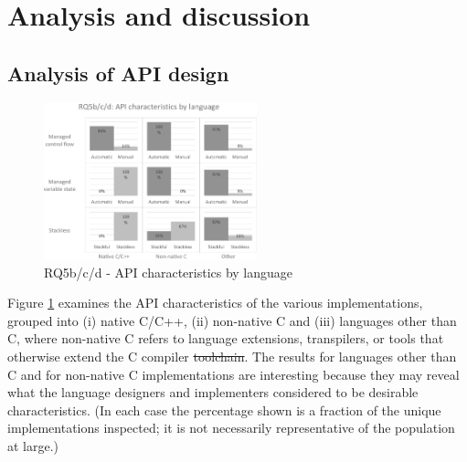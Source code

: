 \documentclass[format=acmsmall, review=false, screen=false]{acmart}
\providecommand{\DIFadd}[1]{{\protect\color{blue}\uwave{#1}}} %
\providecommand{\DIFdel}[1]{{\protect\color{red}\sout{#1}}}                      %
\providecommand{\DIFaddbegin}{} %
\providecommand{\DIFaddend}{} %
\providecommand{\DIFdelbegin}{} %
\providecommand{\DIFdelend}{} %
\newcommand{\DIFscaledelfig}{0.5}
\newlength{\DIFdelgraphicswidth} %
\newlength{\DIFdelgraphicsheight} %
\newcommand{\DIFaddincludegraphics}[2][]{{\color{blue}\fbox{\DIFOincludegraphics[#1]{#2}}}} %
\newcommand{\DIFdelincludegraphics}[2][]{%
\sbox{\DIFdelgraphicsbox}{\DIFOincludegraphics[#1]{#2}}%
\settoboxwidth{\DIFdelgraphicswidth}{\DIFdelgraphicsbox} %
\settoboxtotalheight{\DIFdelgraphicsheight}{\DIFdelgraphicsbox} %
\scalebox{\DIFscaledelfig}{%
\parbox[b]{\DIFdelgraphicswidth}{\usebox{\DIFdelgraphicsbox}\\[-\baselineskip] \rule{\DIFdelgraphicswidth}{0em}}\llap{\resizebox{\DIFdelgraphicswidth}{\DIFdelgraphicsheight}{%
\setlength{\unitlength}{\DIFdelgraphicswidth}%
\begin{picture}(1,1)%
\thicklines\linethickness{2pt} %
{\color[rgb]{1,0,0}\put(0,0){\framebox(1,1){}}}%
{\color[rgb]{1,0,0}\put(0,0){\line( 1,1){1}}}%
{\color[rgb]{1,0,0}\put(0,1){\line(1,-1){1}}}%
\end{picture}%
}\hspace*{3pt}}} %
} %
\DeclareRobustCommand{\DIFaddbegin}{\DIFOaddbegin \let\includegraphics\DIFaddincludegraphics} %
\DeclareRobustCommand{\DIFaddend}{\DIFOaddend \let\includegraphics\DIFOincludegraphics} %
\DeclareRobustCommand{\DIFdelbegin}{\DIFOdelbegin \let\includegraphics\DIFdelincludegraphics} %
\DeclareRobustCommand{\DIFdelend}{\DIFOaddend \let\includegraphics\DIFOincludegraphics} %
\begin{document}
\section{Analysis and discussion}
\label{section:analysis}

\subsection{Analysis of API design}
\label{analysis-of-api-design}

\begin{figure}[h]
	\includegraphics[width=0.55\textwidth]{RQ5b-c-d-API-characteristics-by-language}
	\caption{RQ5b/c/d - API characteristics by language}
	\label{fig:rq5bcd}
\end{figure}

%		

Figure \ref{fig:rq5bcd} examines the API characteristics of the various implementations, grouped into (i) native C/C++, (ii) non-native C and (iii) languages other than C, where non-native C refers to language extensions, transpilers, or tools that otherwise extend the C compiler \DIFdelbegin \DIFdel{toolchain}\DIFdelend \DIFaddbegin \DIFadd{tool chain}\DIFaddend . The results for languages other than C and for non-native C implementations are interesting because they may reveal what the language designers and implementers considered to be desirable characteristics. (In each case the percentage shown is a fraction of the unique implementations inspected; it is not necessarily representative of the population at large.)
\end{document}
